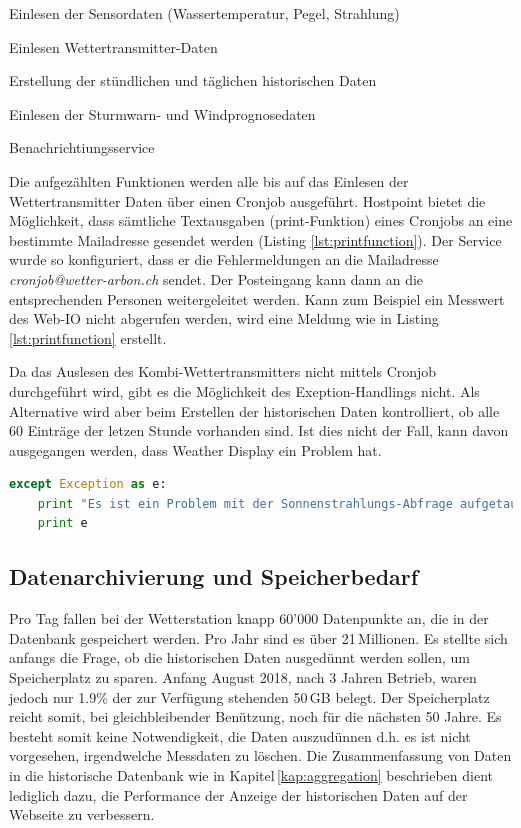 \begin{itemize*}
\item Einlesen der Sensordaten (Wassertemperatur, Pegel, Strahlung)
\item Einlesen Wettertransmitter-Daten
\item Erstellung der stündlichen und täglichen historischen Daten
\item Einlesen der Sturmwarn- und Windprognosedaten
\item Benachrichtiungsservice
\end{itemize*}

\noindent
Die aufgezählten Funktionen werden alle bis auf das Einlesen der Wettertransmitter Daten über einen Cronjob ausgeführt. Hostpoint bietet die Möglichkeit, dass sämtliche Textausgaben (print-Funktion) eines Cronjobs an eine bestimmte Mailadresse gesendet werden (Listing \ref{lst:printfunction}). Der Service wurde so konfiguriert, dass er die Fehlermeldungen an die Mailadresse \emph{cronjob@wetter-arbon.ch} sendet. Der Posteingang kann dann an die entsprechenden Personen weitergeleitet werden. Kann zum Beispiel ein Messwert des Web-IO nicht abgerufen werden, wird eine Meldung wie in Listing\,\ref{lst:printfunction} erstellt.

\noindent
Da das Auslesen des Kombi-Wettertransmitters nicht mittels Cronjob durchgeführt wird, gibt es die Möglichkeit des Exeption-Handlings nicht. Als Alternative wird aber beim Erstellen der historischen Daten kontrolliert, ob alle 60 Einträge der letzen Stunde vorhanden sind. Ist dies nicht der Fall, kann davon ausgegangen werden, dass Weather Display ein Problem hat.

\vspace{3mm}
\begin{lstlisting}[label=lst:printfunction,caption=Beispiel eines Exeption-Handlings, language=Python, style=py]
except Exception as e:
    print "Es ist ein Problem mit der Sonnenstrahlungs-Abfrage aufgetaucht: "
    print e
\end{lstlisting}
\vspace{3mm}


\subsection{Datenarchivierung und Speicherbedarf}
Pro Tag fallen bei der Wetterstation knapp 60'000 Datenpunkte an, die in der Datenbank gespeichert werden. Pro Jahr sind es über 21\,Millionen. Es stellte sich anfangs die Frage, ob die historischen Daten ausgedünnt werden sollen, um Speicherplatz zu sparen. Anfang August 2018, nach 3 Jahren Betrieb, waren jedoch nur 1.9\% der zur Verfügung stehenden 50\,GB belegt. Der Speicherplatz reicht somit, bei gleichbleibender Benützung, noch für die nächsten 50 Jahre. Es besteht somit keine Notwendigkeit, die Daten auszudünnen d.h. es ist nicht vorgesehen, irgendwelche Messdaten zu löschen. Die Zusammenfassung von Daten in die historische Datenbank wie in Kapitel\,\ref{kap:aggregation} beschrieben dient lediglich dazu, die Performance der Anzeige der historischen Daten auf der Webseite zu verbessern.
